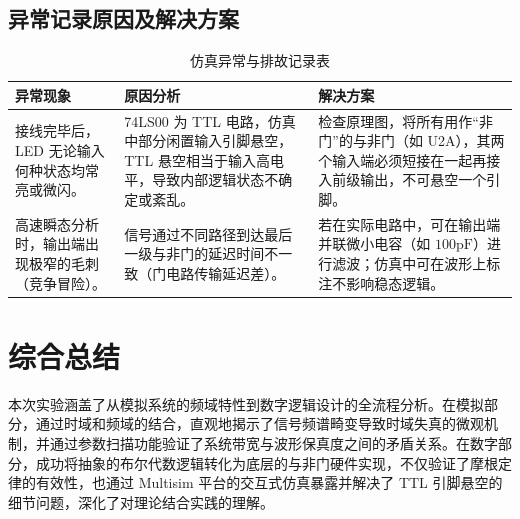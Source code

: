\documentclass[12pt, a4paper]{article}
\begin{document}
\subsection{异常记录原因及解决方案}
\begin{table}[H]
    \centering
    \caption{仿真异常与排故记录表}
    \begin{tabular}{p{3.5cm}p{5cm}p{6cm}}
        \toprule
        \textbf{异常现象} & \textbf{原因分析} & \textbf{解决方案} \\
        \midrule
        接线完毕后，LED 无论输入何种状态均常亮或微闪。 
        & 74LS00 为 TTL 电路，仿真中部分闲置输入引脚悬空，TTL 悬空相当于输入高电平，导致内部逻辑状态不确定或紊乱。 
        & 检查原理图，将所有用作“非门”的与非门（如 U2A），其两个输入端必须短接在一起再接入前级输出，不可悬空一个引脚。 \\
        \midrule
        高速瞬态分析时，输出端出现极窄的毛刺（竞争冒险）。 
        & 信号通过不同路径到达最后一级与非门的延迟时间不一致（门电路传输延迟差）。 
        & 若在实际电路中，可在输出端并联微小电容（如 $100\text{pF}$）进行滤波；仿真中可在波形上标注不影响稳态逻辑。 \\
        \bottomrule
    \end{tabular}
\end{table}

\section{综合总结}
本次实验涵盖了从模拟系统的频域特性到数字逻辑设计的全流程分析。在模拟部分，通过时域和频域的结合，直观地揭示了信号频谱畸变导致时域失真的微观机制，并通过参数扫描功能验证了系统带宽与波形保真度之间的矛盾关系。在数字部分，成功将抽象的布尔代数逻辑转化为底层的与非门硬件实现，不仅验证了摩根定律的有效性，也通过 Multisim 平台的交互式仿真暴露并解决了 TTL 引脚悬空的细节问题，深化了对理论结合实践的理解。
\end{document}
